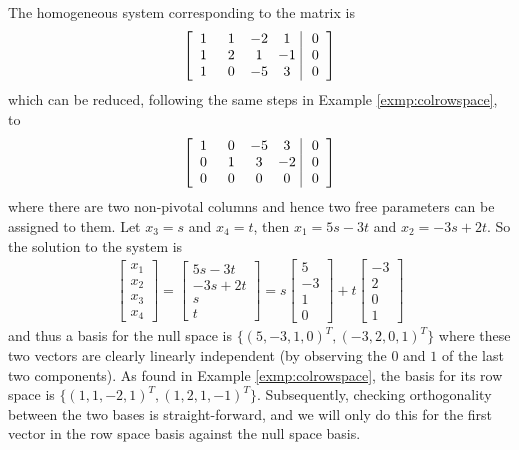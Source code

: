 \begin{solution}
The homogeneous system corresponding to the matrix is
\begin{align*}
\left[\begin{array}{@{\;}wc{10pt}wc{10pt}wc{10pt}wc{10pt}|wc{10pt}@{\;}}
1 & 1 & -2 & 1 & 0\\
1 & 2 & 1 & -1 & 0\\
1 & 0 & -5 & 3 & 0
\end{array}\right]
\end{align*}
which can be reduced, following the same steps in Example \ref{exmp:colrowspace}, to
\begin{align*}
\left[\begin{array}{@{\;}wc{10pt}wc{10pt}wc{10pt}wc{10pt}|wc{10pt}@{\;}}
1 & 0 & -5 & 3 & 0 \\
0 & 1 & 3 & -2 & 0\\
0 & 0 & 0 & 0 & 0
\end{array}\right]
\end{align*}
where there are two non-pivotal columns and hence two free parameters can be assigned to them. Let $x_3 = s$ and $x_4 = t$, then $x_1 = 5s - 3t$ and $x_2 = -3s + 2t$. So the solution to the system is
\begin{align*}
\begin{bmatrix}
x_1 \\
x_2 \\
x_3 \\
x_4
\end{bmatrix}
=
\begin{bmatrix}
5s-3t \\
-3s+2t \\
s \\
t
\end{bmatrix}
=
s
\begin{bmatrix}
5\\
-3\\
1\\
0
\end{bmatrix}
+ t
\begin{bmatrix}
-3 \\
2 \\
0 \\
1
\end{bmatrix}
\end{align*}
and thus a basis for the null space is $\{(5,-3,1,0)^T, (-3,2,0,1)^T\}$ where these two vectors are clearly linearly independent (by observing the $0$ and $1$ of the last two components). As found in Example \ref{exmp:colrowspace}, the basis for its row space is $\{(1,1,-2,1)^T, (1,2,1,-1)^T\}$. Subsequently, checking orthogonality between the two bases is straight-forward, and we will only do this for the first vector in the row space basis against the null space basis.

\end{solution}
